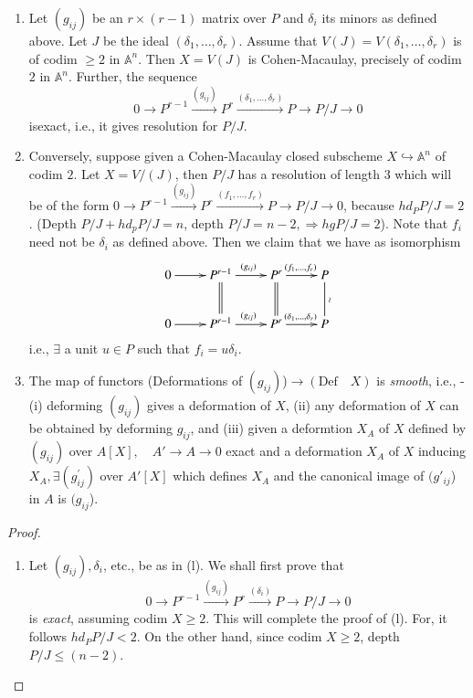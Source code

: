 {\begin{theorem}\label{part1-thm5.1}
\begin{enumerate}[\rm(1)]
\item Let $(g_{ij})$ be an $r\times(r-1)$ matrix over $P$ and
$\delta_i$ its minors as defined above. Let $J$ be the ideal
$(\delta_1,\ldots,\delta_r)$. Assume that
$V(J)=V(\delta_1,\ldots,\delta_r)$ is of codim $\ge 2$ in
$\mathbb{A}^{n}$. Then $X=V(J)$ is Cohen-Macaulay, precisely of codim
$2$ in $\mathbb{A}^{n}$. Further, the sequence 
$$
0\rightarrow
P^{r-1}\xrightarrow{(g_{ij})}P^{r}\xrightarrow{(\delta_1,\dots,\delta_r)}P\rightarrow
P/J\rightarrow 0 
$$
is\pageoriginale exact, i.e., it gives resolution for $P/J$.

\item Conversely, suppose given a Cohen-Macaulay closed subscheme
$X\hookrightarrow \mathbb{A}^{n}$ of codim $2$. Let $X=V/(J)$, then
$P/J$ has a resolution of length 3 which will be of the form
$0\rightarrow
P^{r-1}\xrightarrow{(g_{ij})}P^{r}\xrightarrow{(f_1,\ldots,f_r)} P\rightarrow
P/J \to 0$, because $hd_{P}P/J=2$. (Depth $P/J+hd_{p}P/J=n$, depth
$P/J=n-2, \Rightarrow hg P/J=2$). Note that $f_i$ need not be
$\delta_i$ as defined above. Then we claim that we have as isomorphism 
\begin{equation*}
\xymatrix{
0\ar[r] & P^{r-1}\ar[r]^{(g_{ij})}\ar @{=} [d] &
P^{r}\ar[r]^{(f_{1},\dots,f_r)}\ar @{=} [d]& P\ar @{-} [d]^{\wr}  \\ 
0\ar[r]&P^{r-1}\ar[r]^{(g_{ij})}& P^{r}\ar[r]^{(\delta_1,\ldots,\delta_r)} & P
}
\end{equation*}
i.e., $\exists$ a unit $u\in P$ such that $f_i=u\delta_i$.

\item The map of functors (Deformations of $(g_{ij})$)$\to
(\text{Def}\quad X)$ is {\em smooth}, i.e., -(i) deforming $(g_{ij})$
gives a deformation of $X$, (ii) any deformation of $X$ can be
obtained by deforming $g_{ij}$, and (iii) given a deformtion $X_A$ of
$X$ defined by $(g_{ij})$ over $A[X],\quad A'\to A\to 0$ exact and a
deformation $X_A$ of $X$ inducing $X_A, \exists (g^{'}_{ij})$ over
$A'[X]$ which defines $X_A$ and the canonical image of $(g'_{ij}$) in
$A$ is $(g_{ij}$). 
\end{enumerate}
\end{theorem}

\begin{proof}
\begin{enumerate}[(1)]
\item Let $(g_{ij}), \delta_i$, etc., be as in (l). We shall first prove that
$$
0\to P^{r-1}\xrightarrow{(g_{ij})}P^{r}\xrightarrow{(\delta_{i})}P\to P/J\to 0
$$
is {\em exact}, assuming codim $X\ge2$. This will complete the proof
of (l). For, it follows $hd_P P/J<2$. On the other hand, since codim
$X\ge2$, depth $P/J\le(n-2)$. 


\end{enumerate}
\end{proof}}

